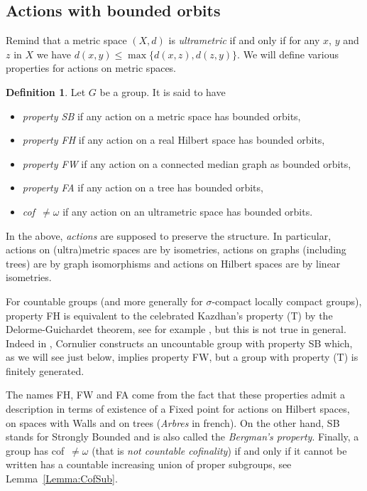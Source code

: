 \documentclass[a4paper]{article}
\theoremstyle{definition}
\newtheorem{defn}[lem]{Definition}
\begin{document}
\subsection{Actions with bounded orbits}
%
%
%
Remind that a metric space $(X,d)$ is \emph{ultrametric} if and only if for any $x$, $y$ and $z$ in $X$ we have $d(x,y)\leq\max\{d(x,z),d(z,y)\}$. We will define various properties for actions on metric spaces.
% 
\begin{defn}\label{Def:FHFA}
Let $G$ be a group.
It is said to have
\begin{itemize}
\item\emph{property SB} if any action on a metric space has bounded orbits,
\item \emph{property FH} if any action on a real Hilbert space has bounded orbits,
\item
\emph{property FW} if any action on a connected median graph as bounded orbits,
\item
\emph{property FA} if any action on a tree has bounded orbits,
\item
\emph{cof~$\neq\omega$} if any action on an ultrametric space has bounded orbits.
\end{itemize}
In the above, \emph{actions} are supposed to preserve the structure. In particular, actions on (ultra)metric spaces are by isometries, actions on graphs (including trees) are by graph isomorphisms and actions on Hilbert spaces are by linear isometries.

\end{defn}
%
%
For countable groups (and more generally for $\sigma$-compact locally compact groups), property FH is equivalent to the celebrated Kazdhan's property (T) by the Delorme-Guichardet theorem, see for example \cite{MR2415834}, but this is not true in general. Indeed in \cite{MR2240370}, Cornulier constructs an uncountable group with property SB which, as we will see just below, implies property FW, but a group with property (T) is finitely generated.

The names FH, FW and FA come from the fact that these properties admit a description in terms of existence of a Fixed point for actions on Hilbert spaces, on spaces with Walls and on trees (\emph{Arbres} in french).
On the other hand, SB stands for Strongly Bounded and is also called the \emph{Bergman's property}.
Finally, a group has cof~$\neq\omega$ (that is \emph{not countable cofinality}) if and only if it cannot be written has a countable increasing union of proper subgroups, see Lemma~\ref{Lemma:CofSub}.
\end{document}
